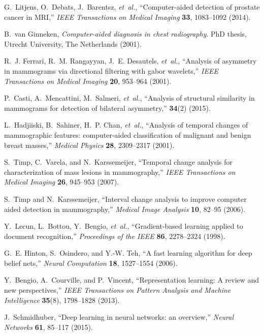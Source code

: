 \documentclass[12pt]{spieman}  %
\begin{document}
\begin{thebibliography}{10}
G.~Litjens, O.~Debats, J.~Barentsz, {\em et~al.}, ``Computer-aided detection of
  prostate cancer in {MRI},'' {\em IEEE Transactions on Medical Imaging} {\bf
  33}, 1083--1092  (2014).

B.~van Ginneken, {\em Computer-aided diagnosis in chest radiography}.
\newblock PhD thesis, Utrecht University, The Netherlands  (2001).

R.~J. Ferrari, R.~M. Rangayyan, J.~E. Desautels, {\em et~al.}, ``Analysis of
  asymmetry in mammograms via directional filtering with gabor wavelets,'' {\em
  IEEE Transactions on Medical Imaging} {\bf 20}, 953--964  (2001).

P.~Casti, A.~Mencattini, M.~Salmeri, {\em et~al.}, ``Analysis of structural
  similarity in mammograms for detection of bilateral asymmetry,''  {\bf 34}(2)
   (2015).

L.~Hadjiiski, B.~Sahiner, H.~P. Chan, {\em et~al.}, ``Analysis of temporal
  changes of mammographic features: computer-aided classification of malignant
  and benign breast masses,'' {\em Medical Physics} {\bf 28}, 2309--2317
  (2001).

S.~Timp, C.~Varela, and N.~Karssemeijer, ``Temporal change analysis for
  characterization of mass lesions in mammography,'' {\em IEEE Transactions on
  Medical Imaging} {\bf 26}, 945--953  (2007).

S.~Timp and N.~Karssemeijer, ``Interval change analysis to improve computer
  aided detection in mammography,'' {\em Medical Image Analysis} {\bf 10},
  82--95  (2006).

Y.~Lecun, L.~Bottou, Y.~Bengio, {\em et~al.}, ``Gradient-based learning applied
  to document recognition,'' {\em Proceedings of the IEEE} {\bf 86}, 2278--2324
   (1998).

G.~E. Hinton, S.~Osindero, and Y.-W. Teh, ``A fast learning algorithm for deep
  belief nets,'' {\em Neural Computation} {\bf 18}, 1527--1554  (2006).

Y.~Bengio, A.~Courville, and P.~Vincent, ``Representation learning: A review
  and new perspectives,'' {\em IEEE Transactions on Pattern Analysis and
  Machine Intelligence} {\bf 35}(8), 1798--1828  (2013).

J.~Schmidhuber, ``Deep learning in neural networks: an overview,'' {\em Neural
  Networks} {\bf 61}, 85--117  (2015).


\end{thebibliography}
\end{document}
